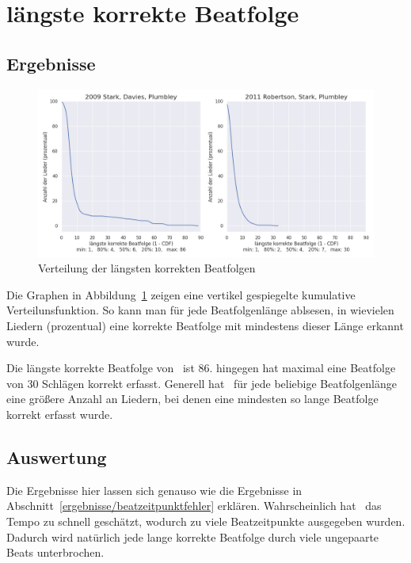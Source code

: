 \section{längste korrekte Beatfolge}
{
	\subsection{Ergebnisse}
	{
		\begin{figure}[h]
			\centering
			\includegraphics[scale=0.47]{resources/longest_streak.png}
			\caption{Verteilung der längsten korrekten Beatfolgen}
			\label{fig:longest_streak}
		\end{figure}

		Die Graphen in Abbildung~\ref{fig:longest_streak} zeigen eine vertikel gespiegelte kumulative Verteilunsfunktion.
		So kann man für jede Beatfolgenlänge ablsesen,
			in wievielen Liedern (prozentual) eine korrekte Beatfolge mit mindestens dieser Länge erkannt wurde.

		Die längste korrekte Beatfolge von~\cite{2009_DaPlSt} ist \num{86}.
		\cite{2011_PlRoSt} hingegen hat maximal eine  Beatfolge von \num{30} Schlägen korrekt erfasst.
		Generell hat~\cite{2009_DaPlSt} für jede beliebige Beatfolgenlänge eine größere Anzahl an Liedern,
			bei denen eine mindesten so lange Beatfolge korrekt erfasst wurde.
	}

	\subsection{Auswertung}
	{
		Die Ergebnisse hier lassen sich genauso wie die Ergebnisse in Abschnitt~\ref{ergebnisse/beatzeitpunktfehler} erklären.
		Wahrscheinlich hat~\cite{2011_PlRoSt} das Tempo zu schnell geschätzt,
			wodurch zu viele Beatzeitpunkte ausgegeben wurden.
		Dadurch wird natürlich jede lange korrekte Beatfolge durch viele ungepaarte Beats unterbrochen.
	}

}

